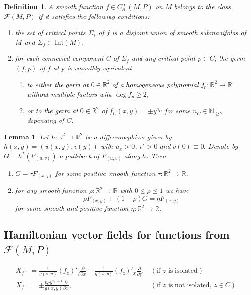 \documentclass[10pt,a4paper]{amsart}
\newtheorem{definition}{Definition}
\newtheorem{lemma}{Lemma}
\newcommand{\F}{\mathcal{F}(M,P)}
\newcommand{\bbN}{\mathbb{N}}
\newcommand{\bbR}{\mathbb{R}}
\newcommand{\textr}[1]{\textcolor{black}{#1}}
\begin{document}
\begin{definition}\label{def:class-F} 
	 \normalfont A smooth function $f\in C_{\partial}^{\infty}(M,P)$ on $M$ belongs to the class $\mathcal{F}(M, P)$ if it satisfies the following conditions:
	\begin{enumerate}
		\item the set of critical points $\Sigma_f$ of $f$ is a disjoint union of smooth submanifolds of $M$ and $\Sigma_f\subset \mathrm{Int}(M),$
		\item  for each connected component $C$ of $\Sigma_f$ and any critical point $p\in C$,
		the germ $(f,p)$ of $f$ at $p$ is smoothly equivalent 
		\begin{enumerate}
			\item[(a)] to either \textr{the germ at $0\in \bbR^2$ of a homogeneous polynomial} $f_p:\bbR^2\to \bbR$ without multiple factors  with $\deg f_p\geq 2$,
			\item[(b)] or to \textr{the germ at $0\in \bbR^2$ } of  $f_C(x,y) = \pm y^{n_C}$  for some $n_C\in \bbN_{\geq 2}$ depending of $C.$  
		\end{enumerate}
	\end{enumerate}
\end{definition}

\begin{lemma}\label{lm:technical-lema}
	Let $h:\mathbb{R}^2\to \bbR^2$ be a diffeomorphism given by $h(x,y) = (u(x,y), v(y))$ with $u_x >0$, $v'>0$ and $v(0) \equiv 0$. Denote by  $G = h^*(F_{(u,v)})$  a pull-back of $F_{(u,v)}$ along $h$. Then 
	\begin{enumerate}
		\item $G = \tau F_{(x,y)}$ for some positive smooth function $\tau:\bbR^2\to \bbR$,
		\item for any smooth  function $\rho:\bbR^2\to \bbR$ with $0\leq \rho\leq 1$ we have 
		$$
		\rho F_{(x,y)}+(1-\rho) G = \eta F_{(x,y)}
		$$
		 for some smooth and positive function $\eta:\mathbb{R}^2\to \bbR$.
	\end{enumerate}
\end{lemma}

\subsection{Hamiltonian vector fields for functions from $\F$}\label{ssec:ham-function-F}

\begin{align}
	X_f &= \frac{1}{g(x,y)}  (f_z)'_y\frac{\partial}{\partial x} - \frac{1}{g(x,y)} (f_z)'_x\frac{\partial}{\partial y}, &(\text{if $z$ is isolated})\label{eq:ham-vf-near-iso}   \\
	 X_f &= \pm\frac{n_Cy^{n_C-1}}{{g}(x,y)}\frac{\partial}{\partial x},& (\text{if $z$ is not isolated, $z\in C$})\label{eq:Ham-near-C}
\end{align}
\end{document}
